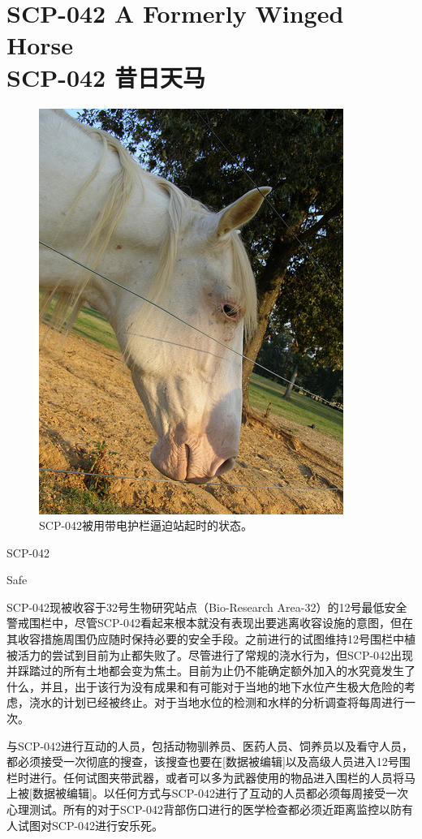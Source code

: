 \chapter[SCP-042 昔日天马]{
    SCP-042 A Formerly Winged Horse\\
    SCP-042 昔日天马
}

\label{chap:SCP-042}

\begin{figure}[H]
    \centering
    \includegraphics[width=0.5\linewidth]{images/SCP-042.jpg}
    \caption*{SCP-042被用带电护栏逼迫站起时的状态。}
\end{figure}

SCP-042

Safe

SCP-042现被收容于32号生物研究站点（Bio-Research Area-32）的12号最低安全警戒围栏中，尽管SCP-042看起来根本就没有表现出要逃离收容设施的意图，但在其收容措施周围仍应随时保持必要的安全手段。之前进行的试图维持12号围栏中植被活力的尝试到目前为止都失败了。尽管进行了常规的浇水行为，但SCP-042出现并踩踏过的所有土地都会变为焦土。目前为止仍不能确定额外加入的水究竟发生了什么，并且，出于该行为没有成果和有可能对于当地的地下水位产生极大危险的考虑，浇水的计划已经被终止。对于当地水位的检测和水样的分析调查将每周进行一次。

与SCP-042进行互动的人员，包括动物驯养员、医药人员、饲养员以及看守人员，都必须接受一次彻底的搜查，该搜查也要在{[}数据被编辑]以及高级人员进入12号围栏时进行。任何试图夹带武器，或者可以多为武器使用的物品进入围栏的人员将马上被{[}数据被编辑]。以任何方式与SCP-042进行了互动的人员都必须每周接受一次心理测试。所有的对于SCP-042背部伤口进行的医学检查都必须近距离监控以防有人试图对SCP-042进行安乐死。

